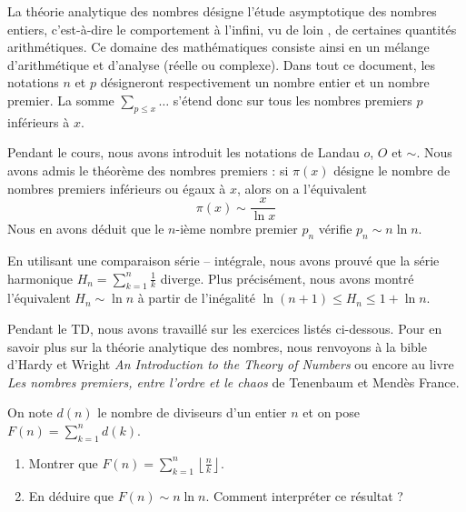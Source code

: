 La théorie analytique des nombres désigne l'étude asymptotique des nombres entiers, c'est-à-dire le comportement à l'infini, \og vu de loin \fg, de certaines quantités arithmétiques. Ce domaine des mathématiques consiste ainsi en un mélange d'arithmétique et d'analyse (réelle ou complexe). Dans tout ce document, les notations $n$ et $p$ désigneront respectivement un nombre entier et un nombre premier. La somme $\sum_{p \leq x} \dots$ s'étend donc sur tous les nombres premiers $p$ inférieurs à $x$.

Pendant le cours, nous avons introduit les notations de Landau $o$, $O$ et $\sim$. Nous avons admis le théorème des nombres premiers : si $\pi(x)$ désigne le nombre de nombres premiers inférieurs ou égaux à $x$, alors on a l'équivalent
$$\pi(x) \sim \frac{x}{\ln x}$$
Nous en avons déduit que le $n$-ième nombre premier $p_n$ vérifie $p_n \sim n \ln n$.

En utilisant une comparaison série -- intégrale, nous avons prouvé que la série harmonique $H_n = \sum_{k=1}^{n} \frac{1}{k}$ diverge. Plus précisément, nous avons montré l'équivalent $H_n \sim \ln n$ à partir de l'inégalité $\ln(n+1) \leq H_n \leq 1 + \ln n $.

Pendant le TD, nous avons travaillé sur les exercices listés ci-dessous. Pour en savoir plus sur la théorie analytique des nombres, nous renvoyons à la bible d'Hardy et Wright \textit{An Introduction to the Theory of Numbers} ou encore au livre \textit{Les nombres premiers, entre l'ordre et le chaos} de Tenenbaum et Mendès France.


\begin{exo}
On note $d(n)$ le nombre de diviseurs d'un entier $n$ et on pose $F(n) = \displaystyle\sum_{k=1}^{n} d(k)$.
\begin{enumerate}
\item Montrer que $F(n) = \displaystyle\sum_{k=1}^{n} \left\lfloor \frac{n}{k} \right\rfloor$.
\item En déduire que $F(n) \sim n \ln n$. Comment interpréter ce résultat ?
\end{enumerate}
\end{exo}


